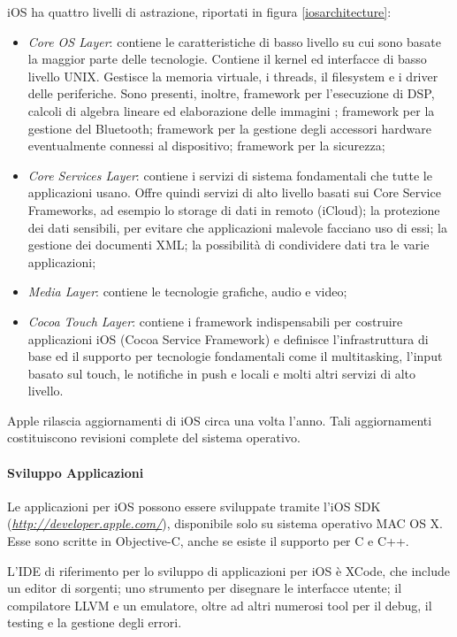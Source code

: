 iOS ha quattro livelli di astrazione, riportati in figura \ref{iosarchitecture}:
\begin{itemize}
\item \emph{Core OS Layer}: contiene le caratteristiche di basso livello su cui sono basate la maggior parte delle tecnologie. Contiene il kernel ed interfacce di basso livello UNIX. Gestisce la memoria virtuale, i threads, il filesystem e i driver delle periferiche.
Sono presenti, inoltre, framework per l'esecuzione di DSP, calcoli di algebra lineare ed elaborazione delle immagini ; framework per la gestione del Bluetooth; framework per la gestione degli accessori hardware eventualmente connessi al dispositivo; framework per la sicurezza;
\item \emph{Core Services Layer}: contiene i servizi di sistema fondamentali che tutte le applicazioni usano. Offre quindi servizi di alto livello basati sui Core Service Frameworks, ad esempio lo storage di dati in remoto (iCloud); la protezione dei dati sensibili, per evitare che applicazioni malevole facciano uso di essi; la gestione dei documenti XML; la possibilità di condividere dati tra le varie applicazioni;
\item \emph{Media Layer}: contiene le tecnologie grafiche, audio e video;
\item \emph{Cocoa Touch Layer}: contiene i framework indispensabili per costruire applicazioni iOS (Cocoa Service Framework) e definisce l'infrastruttura di base ed il supporto per tecnologie fondamentali come il multitasking, l'input basato sul touch, le notifiche in push e locali e molti altri servizi di alto livello.
\end{itemize}

Apple rilascia aggiornamenti di iOS circa una volta l'anno. Tali aggiornamenti costituiscono revisioni complete del sistema operativo.
\paragraph{Sviluppo Applicazioni}
Le applicazioni per iOS possono essere sviluppate tramite l'iOS SDK (\emph{\url{http://developer.apple.com/}}),  disponibile solo su sistema operativo MAC OS X. Esse sono scritte in Objective-C, anche se esiste il supporto per C e C++.

L'IDE di riferimento per lo sviluppo di applicazioni per iOS è XCode, che include un editor di sorgenti; uno strumento per disegnare le interfacce utente; il compilatore LLVM  e un emulatore, oltre ad altri numerosi tool per il debug, il testing e la gestione degli errori.


